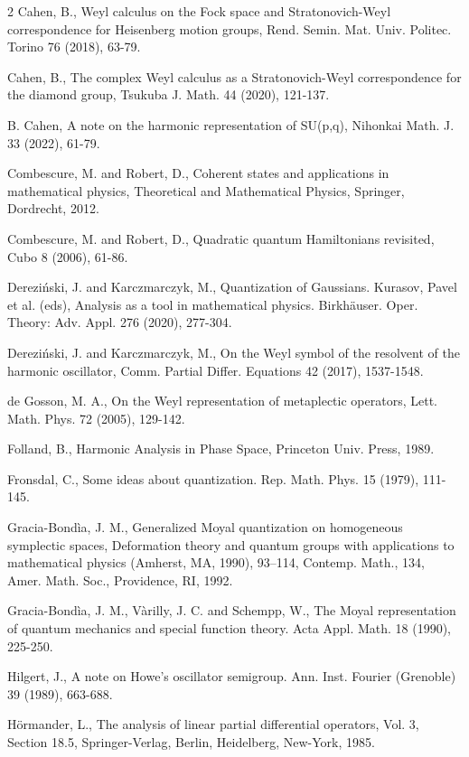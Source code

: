 \documentclass[12pt]{amsart}
\numberwithin{equation}{section}
\begin{document}
\begin{thebibliography}{2}
 Cahen, B., Weyl calculus on the Fock space and Stratonovich-Weyl correspondence for Heisenberg motion groups, Rend. Semin. Mat. Univ. Politec. Torino 76 (2018), 63-79.

 Cahen, B., The complex Weyl calculus as a Stratonovich-Weyl correspondence for the diamond group, Tsukuba J. Math. 44 (2020), 121-137.

 B. Cahen,  A note on the harmonic representation of SU(p,q), Nihonkai Math. J. 33 (2022), 61-79.

 Combescure, M. and Robert, D., Coherent states and applications in mathematical physics, Theoretical and Mathematical Physics, Springer, Dordrecht, 2012.

 Combescure, M. and Robert, D., Quadratic quantum Hamiltonians revisited, 
Cubo 8 (2006), 61-86. 

 Derezi\'nski, J. and Karczmarczyk, M.,
Quantization of Gaussians. Kurasov, Pavel et al. (eds), Analysis as a tool in mathematical physics. Birkhäuser. Oper. Theory: Adv. Appl. 276 (2020), 277-304.

 Derezi\'nski, J. and Karczmarczyk, M., On the Weyl symbol of the resolvent of the harmonic oscillator, Comm. Partial Differ. Equations 42 (2017), 1537-1548.

 de Gosson, M. A., On the Weyl representation of metaplectic operators, Lett. Math. Phys. 72 (2005), 129-142.

 Folland, B.,  Harmonic Analysis in Phase Space,
Princeton Univ. Press, 1989.

 Fronsdal, C., Some ideas about quantization.
Rep. Math. Phys. 15 (1979), 111-145.

 Gracia-Bond\`{i}a, J. M., Generalized Moyal quantization
on homogeneous symplectic spaces, Deformation theory and quantum
groups with applications to mathematical physics (Amherst, MA,
1990), 93--114, Contemp. Math., 134, Amer. Math. Soc., Providence,
RI, 1992.

 Gracia-Bond\`{i}a, J. M., V\`{a}rilly, J. C. and Schempp, W.,
The Moyal representation of quantum mechanics and special function theory.
Acta Appl. Math. 18 (1990), 225-250.

 Hilgert, J., A note on Howe's oscillator semigroup. Ann. Inst. Fourier (Grenoble) 39 (1989), 663-688.

 H\"ormander, L., The analysis of linear partial
differential operators, Vol. 3, Section 18.5, Springer-Verlag,
Berlin, Heidelberg, New-York, 1985.


\end{thebibliography}
\end{document}
